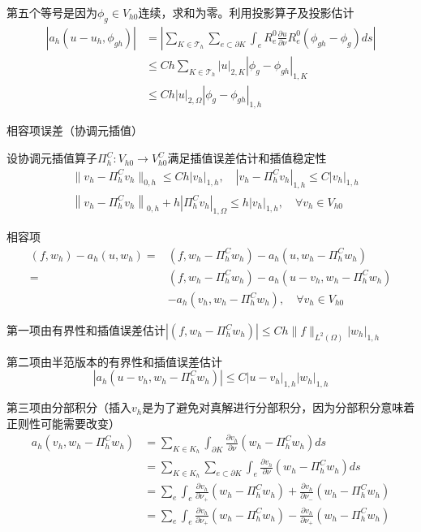 第五个等号是因为$\phi_g \in V_{h0}$连续，求和为零。利用投影算子及投影估计
\[
  \begin{aligned}
    |a_{h}(u-u_{h}, \phi_{g h})|&=\left|\sum_{K \in \mathcal{T}_{h}} \sum_{e \subset \partial K} \int_{e} R_{e}^{0} \frac{\partial u}{\partial \nu} R_{e}^{0}\left(\phi_{g h}-\phi_{g}\right) ds \right| \\
    &\le C h \sum_{K \in \mathcal{T}_{h}}|u|_{2, K}\left|\phi_{g}-\phi_{g h}\right|_{1, K}\\
    &\le C h|u|_{2, \Omega}\left|\phi_{g}-\phi_{g h}\right|_{1, h}
  \end{aligned}
\]

相容项误差（协调元插值）

设协调元插值算子$\Pi_{h}^{C}: V_{h 0} \rightarrow V_{h 0}^{C}$满足插值误差估计和插值稳定性
\[
  \begin{aligned}
    &\|v_h - \Pi_h^C v_h\|_{0, h} \le Ch|v_h|_{1, h}, \quad |v_h - \Pi_h^C v_h|_{1, h} \le C|v_h|_{1, h}\\
    &\left\|v_{h}-\Pi_{h}^{C} v_{h}\right\|_{0, h}+h\left|\Pi_{h}^{C} v_{h}\right|_{1, \Omega} \le h\left|v_{h}\right|_{1, h}, \quad \forall v_{h} \in V_{h 0}
  \end{aligned}
\]

相容项
\[
  \begin{aligned}
    (f, w_{h})-a_{h}(u, w_{h})=&(f, w_{h}-\Pi_{h}^{C} w_{h})-a_{h}(u, w_{h}-\Pi_{h}^{C} w_{h}) \\
    =&(f, w_{h}-\Pi_{h}^{C} w_{h})-a_{h}(u-v_{h}, w_{h}-\Pi_{h}^{C} w_{h})\\
    &-a_{h}(v_{h}, w_{h}-\Pi_{h}^{C} w_{h}), \quad \forall v_{h} \in V_{h0}
  \end{aligned}
\]

第一项由有界性和插值误差估计$\left|\left(f, w_{h}-\Pi_{h}^{C} w_{h}\right)\right| \le C h\|f\|_{L^{2}(\Omega)}\left|w_{h}\right|_{1, h}$

第二项由半范版本的有界性和插值误差估计
\[
  \left|a_{h}\left(u-v_{h}, w_{h}-\Pi_{h}^{C} w_{h}\right)\right| \le C\left|u-v_{h}\right|_{1, h}\left|w_{h}\right|_{1, h} 
\]

第三项由分部积分（插入$v_h$是为了避免对真解进行分部积分，因为分部积分意味着正则性可能需要改变）
\[
  \begin{aligned}
    a_{h}\left(v_{h}, w_{h}-\Pi_{h}^{C} w_{h}\right) & =\sum_{K \in K_{h}} \int_{\partial K} \frac{\partial v_{h}}{\partial \nu}\left(w_{h}-\Pi_{h}^{C} w_{h}\right) ds \\
    &=\sum_{K \in K_h} \sum_{e \subset \partial K} \int_{e} \frac{\partial v_{h}}{\partial \nu}\left(w_{h}-\Pi_{h}^{C} w_{h}\right) ds\\
    &=\sum_{e} \int_{e} \frac{\partial v_{h}}{\partial \nu_+}\left(w_{h}-\Pi_{h}^{C} w_{h}\right) + \frac{\partial v_{h}}{\partial \nu_-}\left(w_{h}-\Pi_{h}^{C} w_{h}\right) \\
    &=\sum_{e} \int_{e} \frac{\partial v_{h}}{\partial \nu_+}\left(w_{h}-\Pi_{h}^{C} w_{h}\right) - \frac{\partial v_{h}}{\partial \nu_+}\left(w_{h}-\Pi_{h}^{C} w_{h}\right) 
  \end{aligned}
\]

